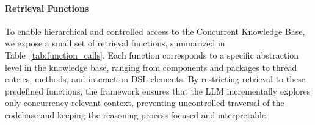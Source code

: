 \vspace{-0.5em}

\vspace{-0.5em}

\paragraph{Retrieval Functions}
\label{subsec:ckb-retrieval}

To enable hierarchical and controlled access to the Concurrent Knowledge Base, we expose a small set of retrieval functions, summarized in Table~\ref{tab:function_calls}.
Each function corresponds to a specific abstraction level in the knowledge base, ranging from components and packages to thread entries, methods, and interaction DSL elements.
By restricting retrieval to these predefined functions, the framework ensures that the LLM incrementally explores only concurrency-relevant context, preventing uncontrolled traversal of the codebase and keeping the reasoning process focused and interpretable.
